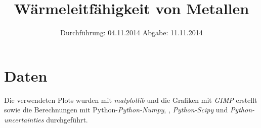 
\usepackage{longtable}

\subject{Versuch 204}
\title{Wärmeleitfähigkeit von Metallen}
\date{
  Durchführung: 04.11.2014
  \hspace{3em}
  Abgabe: 11.11.2014
}


\maketitle
\thispagestyle{empty}
\newpage





\newpage
\section{Daten}




\printbibliography
\noindent Die verwendeten Plots wurden mit \textit{matplotlib}\cite{matplotlib} und die Grafiken mit \textit{GIMP}\cite{gimp} erstellt sowie die Berechnungen mit Python-\textit{Python-Numpy}, \cite{numpy}, \textit{Python-Scipy}\cite{scipy} und \textit{Python-uncertainties}\cite{uncertainties} durchgeführt.

